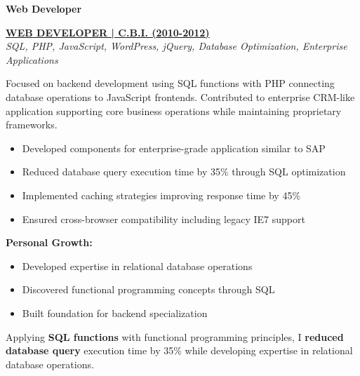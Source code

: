 \documentclass[a4paper,10pt]{article}
\begin{document}
\vspace{0.5cm}
\noindent
{%
	\begin{minipage}{\dimexpr\textwidth-2\fboxsep\relax}
		\vspace{0.2cm}

		{\large\bfseries\color{darkblue}\selectfont Web Developer}
		\vspace{0.3cm}

        \noindent\uline{\textbf{WEB DEVELOPER | C.B.I. (2010-2012)}} \\
		\vspace{0.1cm}
		{\small\textit{SQL, PHP, JavaScript, WordPress, jQuery, Database Optimization, Enterprise Applications}}
		\vspace{0.2cm}

		Focused on backend development using SQL functions with PHP connecting database operations to JavaScript frontends. Contributed to enterprise CRM-like application supporting core business operations while maintaining proprietary frameworks.

		\vspace{0.2cm}
		\begin{itemize}[label=\textcolor{darkblue}{\textbullet}, leftmargin=*, nosep]
			\item Developed components for enterprise-grade application similar to SAP
			\item Reduced database query execution time by 35\% through SQL optimization
			\item Implemented caching strategies improving response time by 45\%
			\item Ensured cross-browser compatibility including legacy IE7 support
		\end{itemize}

		\vspace{0.2cm}
		\textbf{Personal Growth:}
		\vspace{0.2cm}
		\begin{itemize}[label=\textcolor{darkblue}{\textbullet}, leftmargin=*, nosep]
			\item Developed expertise in relational database operations
			\item Discovered functional programming concepts through SQL
			\item Built foundation for backend specialization
		\end{itemize}

        \vspace{0.2cm}

        Applying \textbf{SQL functions} with functional programming principles,
        I \textbf{reduced database query} execution time by 35\% while developing expertise in
        relational database operations.



		\vspace{0.4cm}

    \end{minipage}}
\end{document}
